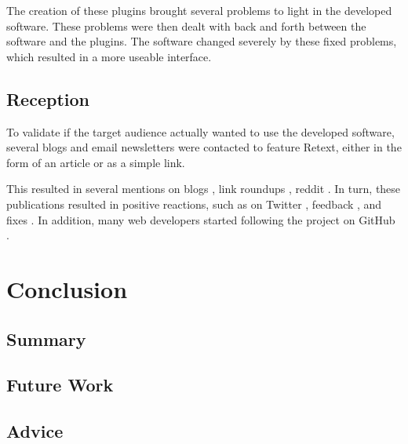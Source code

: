 The creation of these plugins brought several problems to light in the
developed software. These problems were then dealt with back and forth
between the software and the plugins. The software changed severely by
these fixed problems, which resulted in a more useable interface.

\section{Reception}\label{reception}

To validate if the target audience actually wanted to use the developed
software, several blogs and email newsletters were contacted to feature
Retext, either in the form of an article or as a simple link.

This resulted in several mentions on blogs
\autocite{dailyjs.com-natural-language-parsing-retext}, link roundups
\autocites[e.g., ][]{github.com-awesome-machine-learning}
{github.com-awesome-nodejs}, reddit  \autocites[e.g., ][]
{reddit.com-mention-1}{reddit.com-mention-2}{reddit.com-mention-3}. In turn,
these publications resulted in positive reactions, such as on Twitter
\autocites{twitter.com-mention-1}{twitter.com-mention-2}
{twitter.com-mention-3}{twitter.com-mention-4}{twitter.com-mention-5},
feedback \autocites{github.com-issue-1}{github.com-issue-2}, and fixes
\autocite{github.com-pull-request}. In addition, many web developers started
following the project on GitHub \autocite{github.com-stargazers}.

\chapter{Conclusion}\label{conclusion}

\section{Summary}\label{summary}

\section{Future Work}\label{future-work}

\section{Advice}\label{advice}
